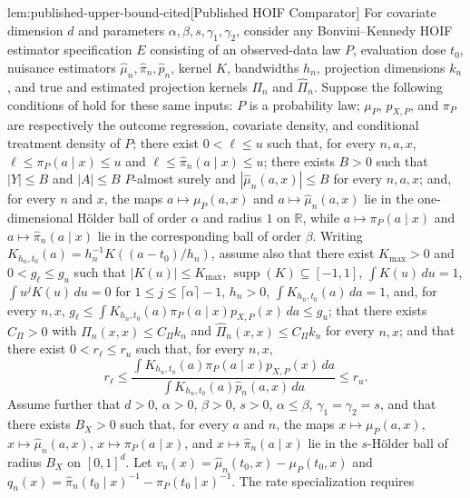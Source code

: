 \begin{citedv}{lem:published-upper-bound-cited}[Published HOIF Comparator]
For covariate dimension \(d\) and parameters \(\alpha,\beta,s,\gamma_1,\gamma_2\), consider any Bonvini--Kennedy HOIF estimator specification \(E\) consisting of an observed-data law \(P\), evaluation dose \(t_0\), nuisance estimators \(\hat\mu_n,\hat\pi_n,\hat p_n\), kernel \(K\), bandwidths \(h_n\), projection dimensions \(k_n\), and true and estimated projection kernels \(\Pi_n\) and \(\widehat\Pi_n\). Suppose the following conditions of \citet[Theorem~3.1 and \S3.4]{bonvini2022} hold for these same inputs: \(P\) is a probability law; \(\mu_P\), \(p_{X,P}\), and \(\pi_P\) are respectively the outcome regression, covariate density, and conditional treatment density of \(P\); there exist \(0<\ell\le u\) such that, for every \(n,a,x\), \(\ell\le\pi_P(a\mid x)\le u\) and \(\ell\le\hat\pi_n(a\mid x)\le u\); there exists \(B>0\) such that \(|Y|\le B\) and \(|A|\le B\) \(P\)-almost surely and \(|\hat\mu_n(a,x)|\le B\) for every \(n,a,x\); and, for every \(n\) and \(x\), the maps \(a\mapsto\mu_P(a,x)\) and \(a\mapsto\hat\mu_n(a,x)\) lie in the one-dimensional Hölder ball of order \(\alpha\) and radius \(1\) on \(\mathbb R\), while \(a\mapsto\pi_P(a\mid x)\) and \(a\mapsto\hat\pi_n(a\mid x)\) lie in the corresponding ball of order \(\beta\). Writing \(K_{h_n,t_0}(a)=h_n^{-1}K((a-t_0)/h_n)\), assume also that there exist \(K_{\max}>0\) and \(0<g_{\ell}\le g_u\) such that \(|K(u)|\le K_{\max}\), \(\operatorname{supp}(K)\subseteq[-1,1]\), \(\int K(u)\,du=1\), \(\int u^jK(u)\,du=0\) for \(1\le j\le\lceil\alpha\rceil-1\), \(h_n>0\), \(\int K_{h_n,t_0}(a)\,da=1\), and, for every \(n,x\), \(g_{\ell}\le\int K_{h_n,t_0}(a)\pi_P(a\mid x)p_{X,P}(x)\,da\le g_u\); that there exists \(C_\Pi>0\) with \(\Pi_n(x,x)\le C_\Pi k_n\) and \(\widehat\Pi_n(x,x)\le C_\Pi k_n\) for every \(n,x\); and that there exist \(0<r_{\ell}\le r_u\) such that, for every \(n,x\),
\[
r_{\ell}\le
\frac{\int K_{h_n,t_0}(a)\pi_P(a\mid x)p_{X,P}(x)\,da}
{\int K_{h_n,t_0}(a)\hat p_n(a,x)\,da}
\le r_u .
\]
Assume further that \(d>0\), \(\alpha>0\), \(\beta>0\), \(s>0\), \(\alpha\le\beta\), \(\gamma_1=\gamma_2=s\), and that there exists \(B_X>0\) such that, for every \(a\) and \(n\), the maps \(x\mapsto\mu_P(a,x)\), \(x\mapsto\hat\mu_n(a,x)\), \(x\mapsto\pi_P(a\mid x)\), and \(x\mapsto\hat\pi_n(a\mid x)\) lie in the \(s\)-Hölder ball of radius \(B_X\) on \([0,1]^d\). Let \(v_n(x)=\hat\mu_n(t_0,x)-\mu_P(t_0,x)\) and \(q_n(x)=\hat\pi_n(t_0\mid x)^{-1}-\pi_P(t_0\mid x)^{-1}\). The rate specialization requires

\end{citedv}
